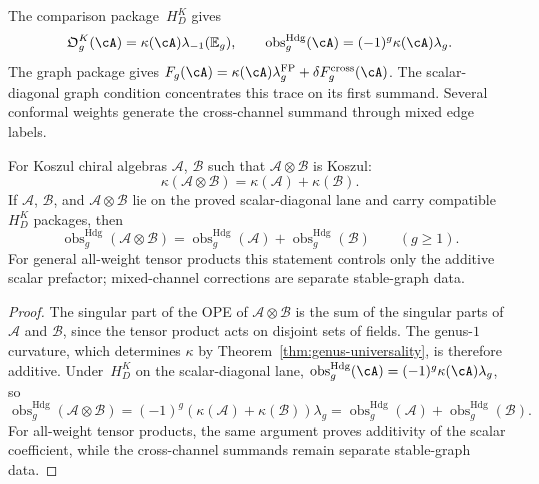 \begin{remark}\label{rem:lambda-universality}
The comparison package~$H_D^K$ gives
\[
 \mathfrak O_g^K(\cA)=\kappa(\cA)\lambda_{-1}(\mathbb E_g),
 \qquad
 \operatorname{obs}^{\mathrm{Hdg}}_g(\cA)
 =(-1)^g\kappa(\cA)\lambda_g.
\]
The graph package gives
\(F_g(\cA)=\kappa(\cA)\lambda_g^{\mathrm{FP}}
+\delta F_g^{\mathrm{cross}}(\cA)\).
The scalar-diagonal graph condition concentrates this trace on its
first summand.  Several conformal weights generate the cross-channel
summand through mixed edge labels.
\end{remark}

\begin{corollary}\label{cor:kappa-additivity}
For Koszul chiral algebras $\mathcal{A}$, $\mathcal{B}$ such that
$\mathcal{A} \otimes \mathcal{B}$ is Koszul:
\begin{equation}\label{eq:kappa-additivity}
\kappa(\mathcal{A} \otimes \mathcal{B}) = \kappa(\mathcal{A}) + \kappa(\mathcal{B}).
\end{equation}
If $\mathcal{A}$, $\mathcal{B}$, and
$\mathcal{A}\otimes\mathcal{B}$ lie on the proved
scalar-diagonal lane and carry compatible $H_D^K$ packages, then
\[
	\operatorname{obs}^{\mathrm{Hdg}}_g(\mathcal{A} \otimes \mathcal{B})
	= \operatorname{obs}^{\mathrm{Hdg}}_g(\mathcal{A})
	+ \operatorname{obs}^{\mathrm{Hdg}}_g(\mathcal{B})
\qquad (g\ge1).
\]
For general all-weight tensor products this statement controls only
the additive scalar prefactor; mixed-channel corrections are separate
stable-graph data.
\end{corollary}

\begin{proof}
The singular part of the OPE of
$\mathcal{A} \otimes \mathcal{B}$ is the sum of the singular parts of
$\mathcal{A}$ and $\mathcal{B}$, since the tensor product acts on
disjoint sets of fields. The genus-$1$ curvature, which determines
$\kappa$ by Theorem~\ref{thm:genus-universality}, is therefore
additive. Under~$H_D^K$ on the scalar-diagonal lane,
	\(\operatorname{obs}^{\mathrm{Hdg}}_g(\cA)
 =(-1)^g\kappa(\cA)\lambda_g\), so
\[
	\operatorname{obs}^{\mathrm{Hdg}}_g(\mathcal{A}\otimes\mathcal{B})
	= (-1)^g(\kappa(\mathcal{A})+\kappa(\mathcal{B}))\lambda_g
	= \operatorname{obs}^{\mathrm{Hdg}}_g(\mathcal{A})
	+\operatorname{obs}^{\mathrm{Hdg}}_g(\mathcal{B}).
\]
For all-weight tensor products, the same argument proves additivity of
the scalar coefficient, while the cross-channel summands remain
separate stable-graph data.
\end{proof}

